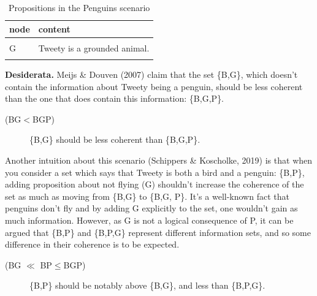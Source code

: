 \documentclass[
  10pt,
]{scrartcl}
\newcommand{\s}[1]{\textsf{#1}}
\begin{document}
\begin{table}[H]

\caption{\label{tab:penguinsPropositions}Propositions in the Penguins scenario}
\centering
\begin{tabular}[t]{ll}
\toprule
node & content\\
\midrule
\cellcolor{gray!6}{B} & \cellcolor{gray!6}{Tweety is a bird.}\\
G & Tweety is a grounded animal.\\
\cellcolor{gray!6}{P} & \cellcolor{gray!6}{Tweety is a penguin.}\\
\bottomrule
\end{tabular}
\end{table}

\noindent \textbf{Desiderata.}
Meijs \& Douven (2007) claim that the set \{\s{B},\s{G}\}, which doesn't contain the information about Tweety being a penguin, should be less coherent than the one that does contain this information: \{\s{B},\s{G},\s{P}\}.

\vspace{2mm}\begin{description}
    \item[(\s{BG}$<$\s{BGP})] \{\s{B},\s{G}\}  should be less coherent than \{\s{B},\s{G},\s{P}\}. 
\end{description}\vspace{2mm}

Another intuition about this scenario (Schippers \& Koscholke, 2019) is that when you consider a set which says that Tweety is both a bird and a penguin: \{\s{B},\s{P}\}, adding proposition about not flying (\s{G}) shouldn't increase the coherence of the set as much as moving from \{\s{B},\s{G}\} to \{\s{B},\s{G}, \s{P}\}. It's a well-known fact that penguins don't fly and by adding \s{G} explicitly to the set, one wouldn't gain as much information.
However, as \s{G} is not a logical consequence of \s{P}, it can be argued that \{\s{B},\s{P}\} and \{\s{B},\s{P},\s{G}\} represent different information sets, and so some difference in their coherence is to be expected.

\vspace{2mm}\begin{description}
    \item[(\s{BG} $\ll$ \s{BP}$\leq$\s{BGP})]  \{\s{B},\s{P}\} should be notably above  \{\s{B},\s{G}\}, and less than \{\s{B},\s{P},\s{G}\}.
\end{description}\vspace{2mm}
\end{document}
